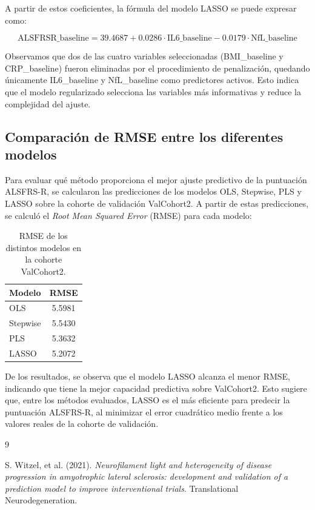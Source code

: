 \documentclass[12pt]{article} %
\begin{document}
A partir de estos coeficientes, la fórmula del modelo LASSO se puede expresar como:

\[
\text{ALSFRSR\_baseline} = 39.4687 + 0.0286 \cdot \text{IL6\_baseline} - 0.0179 \cdot \text{NfL\_baseline}
\]

Observamos que dos de las cuatro variables seleccionadas (BMI\_baseline y CRP\_baseline) fueron eliminadas por el procedimiento de penalización, quedando únicamente IL6\_baseline y NfL\_baseline como predictores activos. Esto indica que el modelo regularizado selecciona las variables más informativas y reduce la complejidad del ajuste.

\subsection{Comparación de RMSE entre los diferentes modelos}

Para evaluar qué método proporciona el mejor ajuste predictivo de la puntuación ALSFRS-R, se calcularon las predicciones de los modelos OLS, Stepwise, PLS y LASSO sobre la cohorte de validación ValCohort2. A partir de estas predicciones, se calculó el \emph{Root Mean Squared Error} (RMSE) para cada modelo:

\begin{table}[h!]
\centering
\begin{tabular}{lc}
\hline
Modelo & RMSE \\ \hline
OLS & 5.5981 \\
Stepwise & 5.5430 \\
PLS & 5.3632 \\
LASSO & 5.2072 \\ \hline
\end{tabular}
\caption{RMSE de los distintos modelos en la cohorte ValCohort2.}
\label{tab:rmse_models}
\end{table}

De los resultados, se observa que el modelo LASSO alcanza el menor RMSE, indicando que tiene la mejor capacidad predictiva sobre ValCohort2. Esto sugiere que, entre los métodos evaluados, LASSO es el más eficiente para predecir la puntuación ALSFRS-R, al minimizar el error cuadrático medio frente a los valores reales de la cohorte de validación.














\begin{thebibliography}{9}

 S. Witzel, et al. (2021). \textit{Neurofilament light and heterogeneity of disease progression in amyotrophic lateral sclerosis: development and validation of a prediction model to improve interventional trials}. Translational Neurodegeneration.

\end{thebibliography}
\end{document}
